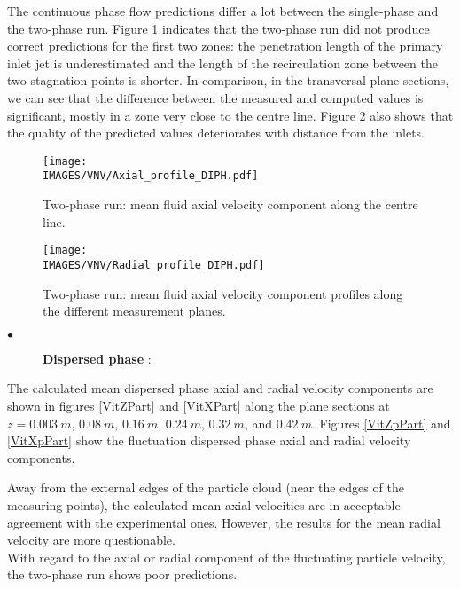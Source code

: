 \noindent

The continuous phase flow predictions differ a lot between the single-phase and the two-phase run. Figure \ref{AxeFluide_diph} indicates that the two-phase run did not produce correct predictions for the first two zones: the penetration length of the primary inlet jet is underestimated and the length of the recirculation zone between the two stagnation points is shorter. In comparison, in the transversal plane sections, we can see that the difference between the measured and computed values is significant, mostly in a zone very close to the centre line. Figure \ref{ProfVZFluide_diph} also shows that the quality of the predicted values deteriorates with distance from the inlets.

\begin{figure}[H]
   \centerline{\texttt{[image: \\IMAGES/VNV/Axial\_profile\_DIPH.pdf]}}
   \caption{Two-phase run: mean fluid axial velocity component along the centre line.}
   \label{AxeFluide_diph}
\end{figure}

\begin{figure}[H]
   \centerline{\texttt{[image: \\IMAGES/VNV/Radial\_profile\_DIPH.pdf]}}
   \caption{Two-phase run: mean fluid axial velocity component profiles along the different measurement planes.}
   \label{ProfVZFluide_diph}
\end{figure}

\begin{description}
   \item[$\bullet$] \textbf{Dispersed phase} :
\end{description}
\noindent

The calculated mean dispersed phase axial and radial velocity components are shown in figures \ref{VitZPart} and \ref{VitXPart} along the plane sections at $z = 0.003~m$, $0.08~m$, $0.16~m$, $0.24~m$, $0.32~m$, and $0.42~m$.
Figures \ref{VitZpPart} and \ref{VitXpPart} show the fluctuation dispersed phase axial and radial velocity components.

\noindent
Away from the external edges of the particle cloud (near the edges of the measuring points), the calculated mean axial velocities are in acceptable agreement with the experimental ones. However, the results for the mean radial velocity are more questionable. \\ With regard to the axial or radial component of the fluctuating particle velocity, the two-phase run shows poor predictions.

